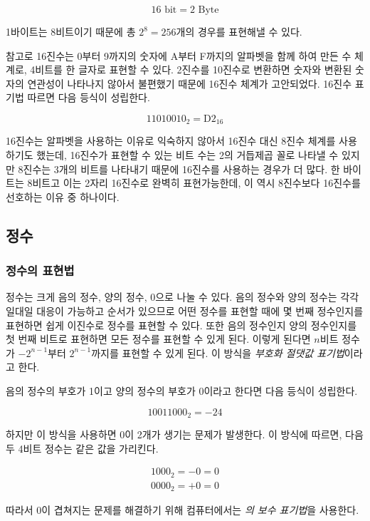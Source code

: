 \documentclass{article}
\begin{document}
$$
16 \text{ bit} = 2 \text{ Byte}
$$

1바이트는 8비트이기 때문에 총 $2^8 = 256$개의 경우를 표현해낼 수 있다.

참고로 16진수는 0부터 9까지의 숫자에 A부터 F까지의 알파벳을 함께 하여 만든 수 체계로,
4비트를 한 글자로 표현할 수 있다. 2진수를 10진수로 변환하면 숫자와 변환된 숫자의 연관성이
나타나지 않아서 불편했기 때문에 16진수 체계가 고안되었다.
16진수 표기법 따르면 다음 등식이 성립한다.

$$
1101 0010_2 = \text{D2}_{16}
$$

16진수는 알파벳을 사용하는 이유로 익숙하지 않아서 16진수 대신 8진수 체계를 사용하기도 했는데,
16진수가 표현할 수 있는
비트 수는 2의 거듭제곱 꼴로 나타낼 수 있지만 8진수는 3개의 비트를 나타내기 때문에 16진수를
사용하는 경우가 더 많다. 한 바이트는 8비트고 이는 2자리 16진수로 완벽히 표현가능한데, 이 역시
8진수보다 16진수를 선호하는 이유 중 하나이다.

\subsection{정수}

\subsubsection{정수의 표현법}

정수는 크게 음의 정수, 양의 정수, 0으로 나눌 수 있다. 음의 정수와 양의 정수는 각각 일대일
대응이 가능하고 순서가 있으므로 어떤 정수를 표현할 때에 몇 번째 정수인지를 표현하면 쉽게
이진수로 정수를 표현할 수 있다. 또한 음의 정수인지 양의 정수인지를 첫 번째 비트로 표현하면
모든 정수를 표현할 수 있게 된다. 이렇게 된다면 $n$비트 정수가 $-2^{n-1}$부터
$2^{n-1}$까지를 표현할 수 있게 된다. 이 방식을 \textit{부호화 절댓값 표기법}이라고 한다.

음의 정수의 부호가 1이고 양의 정수의 부호가 0이라고 한다면 다음 등식이 성립한다.

$$
10011000_2 = -24
$$

하지만 이 방식을 사용하면 0이 2개가 생기는 문제가 발생한다. 이 방식에 따르면,
다음 두 4비트 정수는 같은 값을 가리킨다.

$$
\begin{aligned}
    1000_2 = -0 = 0 \\
    0000_2 = +0 = 0
\end{aligned}
$$

따라서 0이 겹쳐지는 문제를 해결하기 위해 컴퓨터에서는 \textit{의 보수 표기법}을 사용한다.
\end{document}
